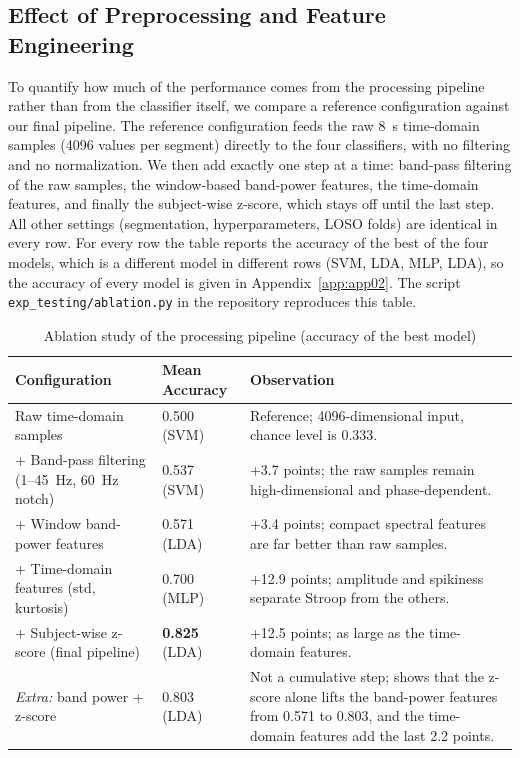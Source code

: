 \subsection{Effect of Preprocessing and Feature Engineering}
To quantify how much of the performance comes from the processing pipeline rather than from the classifier itself, we compare a reference configuration against our final pipeline. The reference configuration feeds the raw 8~s time-domain samples (4096 values per segment) directly to the four classifiers, with no filtering and no normalization. We then add exactly one step at a time: band-pass filtering of the raw samples, the window-based band-power features, the time-domain features, and finally the subject-wise z-score, which stays off until the last step. All other settings (segmentation, hyperparameters, LOSO folds) are identical in every row. For every row the table reports the accuracy of the best of the four models, which is a different model in different rows (SVM, LDA, MLP, LDA), so the accuracy of every model is given in Appendix~\ref{app:app02}. The script \texttt{exp\_testing/ablation.py} in the repository reproduces this table.

\begin{table}[!htb]
    \centering
    \caption{Ablation study of the processing pipeline (accuracy of the best model)}
    \label{tab:ablation}
    \begin{tabularx}{\textwidth}{@{} >{\raggedright\arraybackslash}p{} l X @{}}
        \toprule
        \textbf{Configuration} & \textbf{Mean Accuracy} & \textbf{Observation} \\
        \midrule
        Raw time-domain samples & 0.500 (SVM) & Reference; 4096-dimensional input, chance level is 0.333. \\
        + Band-pass filtering (1--45~Hz, 60~Hz notch) & 0.537 (SVM) & +3.7 points; the raw samples remain high-dimensional and phase-dependent. \\
        + Window band-power features & 0.571 (LDA) & +3.4 points; compact spectral features are far better than raw samples. \\
        + Time-domain features (std, kurtosis) & 0.700 (MLP) & +12.9 points; amplitude and spikiness separate Stroop from the others. \\
        + Subject-wise z-score (final pipeline) & \textbf{0.825} (LDA) & +12.5 points; as large as the time-domain features. \\
        \midrule
        \emph{Extra:} band power + z-score & 0.803 (LDA) & Not a cumulative step; shows that the z-score alone lifts the band-power features from 0.571 to 0.803, and the time-domain features add the last 2.2 points. \\
        \bottomrule
    \end{tabularx}
\end{table}

